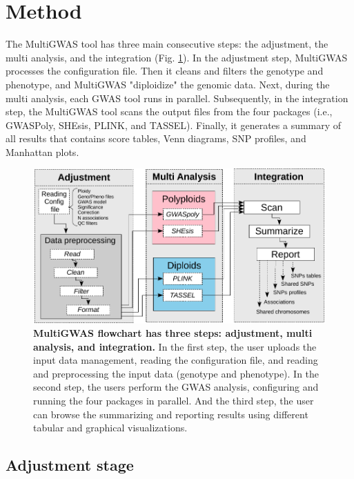 \documentclass{article}
\begin{document}
\section{Method}

The MultiGWAS tool has three main consecutive steps: the adjustment, the multi analysis, and the integration (Fig. \ref{fig:Pipeline}). In the adjustment step, MultiGWAS processes the configuration file. Then it cleans and filters the genotype and phenotype, and  MultiGWAS "diploidize" the genomic data. Next, during the multi analysis, each GWAS tool runs in parallel. Subsequently, in the integration step, the MultiGWAS tool scans the output files from the four packages (i.e., GWASPoly, SHEsis, PLINK, and TASSEL). Finally, it generates a summary of all results that contains score tables, Venn diagrams, SNP profiles, and Manhattan plots. 
\begin{figure}
\centering{}\includegraphics[width=12cm]{images/paper-multiGWAS-flowchart-stages} \caption{\textbf{MultiGWAS flowchart has three steps: adjustment, multi analysis, and integration.} In the first step, the user uploads the input data management, reading the configuration file, and reading and preprocessing the input data (genotype and phenotype). In the second step, the users perform the GWAS analysis, configuring and running the four packages in parallel. And the third step, the user can browse the summarizing and reporting results using different tabular and graphical visualizations.\label{fig:Pipeline}}
\end{figure}



\subsection{Adjustment stage}
\end{document}
